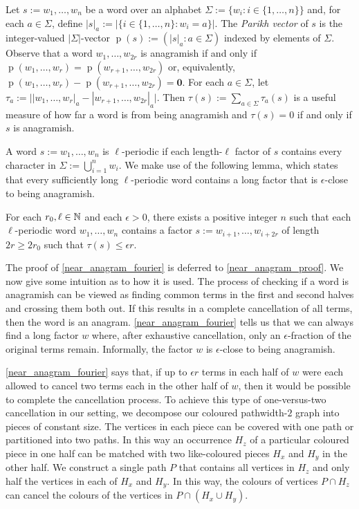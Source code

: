 \documentclass{patmorin}
\DeclareMathOperator{\hist}{p}
\begin{document}
Let $s:=w_1,\ldots,w_n$ be a word over an alphabet $\Sigma:=\{w_i:i\in\{1,\ldots,n\}\}$ and, for each $a\in \Sigma$, define $|s|_a:=|\{i\in\{1,\ldots,n\}:w_i=a\}|$.  The \emph{Parikh vector} of $s$ is the integer-valued $|\Sigma|$-vector $\hist(s):=(|s|_{a}:a\in\Sigma)$ indexed by elements of $\Sigma$.  Observe that a word $w_1,\ldots,w_{2r}$ is anagramish if and only if $\hist(w_1,\ldots,w_r)=\hist(w_{r+1},\ldots,w_{2r})$ or, equivalently, $\hist(w_1,\ldots,w_r)-\hist(w_{r+1},\ldots,w_{2r})=\boldsymbol{0}$.
For each $a\in\Sigma$, let $\tau_a:=\big||w_1,\ldots,w_r|_{a}-|w_{r+1},\ldots,w_{2r}|_{a}\big|$.
Then $\tau(s):=\sum_{a\in\Sigma}\tau_a(s)$ is a useful measure of how far a word is from being anagramish and $\tau(s)=0$ if and only if $s$ is anagramish.

A word $s:=w_1,\ldots,w_n$ is $\ell$-periodic if each length-$\ell$ factor of $s$ contains every character in $\Sigma:=\bigcup_{i=1}^n w_i$.  We make use of the following lemma, which states that every sufficiently long $\ell$-periodic word contains a long factor that is $\epsilon$-close to being anagramish.

\begin{lem}\label{near_anagram_fourier}
    For each $r_0,\ell\in\mathbb{N}$ and each $\epsilon>0$, there exists a positive integer $n$ such that each $\ell$-periodic word $w_1,\ldots,w_n$ contains a factor $s:=w_{i+1},\ldots,w_{i+2r}$ of length $2r \ge 2r_0$ such that $\tau(s)\le \epsilon r$.
\end{lem}

The proof of \cref{near_anagram_fourier} is deferred to \cref{near_anagram_proof}.  We now give some intuition as to how it is used.  The process of checking if a word is anagramish can be viewed as finding common terms in the first and second halves and crossing them both out.  If this results in a complete cancellation of all terms, then the word is an anagram.  \cref{near_anagram_fourier} tells us that we can always find a long factor $w$ where, after exhaustive cancellation, only an $\epsilon$-fraction of the original terms remain.  Informally, the factor $w$ is $\epsilon$-close to being anagramish.

\cref{near_anagram_fourier} says that, if up to $\epsilon r$ terms in each half of $w$ were each allowed to cancel two terms each in the other half of $w$, then it would be possible to complete the cancellation process.  To achieve this type of one-versus-two cancellation in our setting, we decompose our coloured pathwidth-$2$ graph into pieces of constant size.  The vertices in each piece can be covered with one path or partitioned into two paths.  In this way an occurrence $H_z$ of a particular coloured piece in one half can be matched with two like-coloured pieces $H_x$ and $H_y$ in the other half. We construct a single path $P$ that contains all vertices in $H_z$ and only half the vertices in each of $H_x$ and $H_y$.  In this way, the colours of vertices $P\cap H_z$ can cancel the colours of the vertices in $P\cap(H_x\cup H_y)$.
\end{document}
